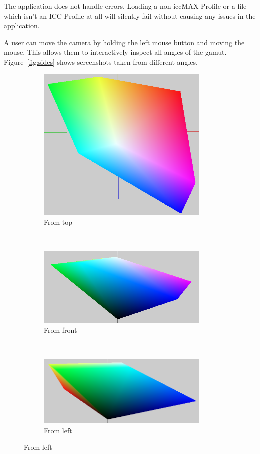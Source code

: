 The application does not handle errors.
Loading a non-iccMAX Profile or a file which isn't an ICC Profile at all will silently fail without causing any issues in the application.

A user can move the camera by holding the left mouse button and moving the mouse.
This allows them to interactively inspect all angles of the gamut.
Figure~\ref{fig:sides} shows screenshots taken from different angles.

\begin{figure}[H]
	\centering
	\begin{subfigure}[t]{0.3\textwidth}
		\centering
		\includegraphics[width=0.9\textwidth]{img/solid-top}
		\caption{From top}
	\end{subfigure}%
	~
	\begin{subfigure}[t]{0.3\textwidth}
		\centering
		\includegraphics[width=0.9\textwidth]{img/solid-front}
		\caption{From front}
	\end{subfigure}%
	~
	\begin{subfigure}[t]{0.3\textwidth}
		\centering
		\includegraphics[width=0.9\textwidth]{img/solid-left}
		\caption{From left}
	\end{subfigure}%


\end{figure}

